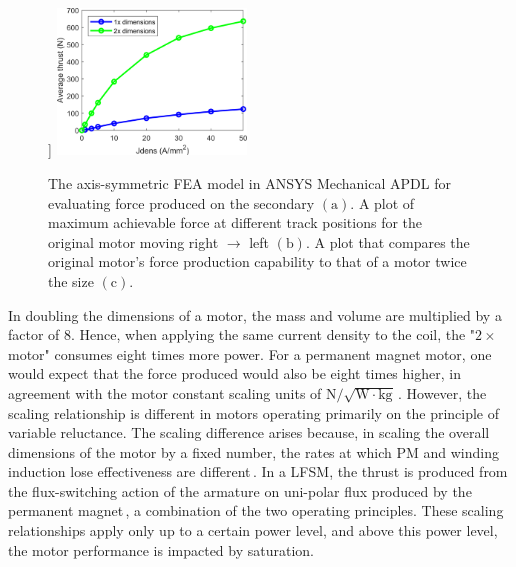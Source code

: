 \begin{figure}[!ht]
                    ]{
                    \includegraphics[width=0.45\textwidth]{chap4/images2/LFSM_scaling_effect.png}
                }
                \caption{ 
                    \label{fig:hap/rsm/LFSM/periodic_fea} The axis-symmetric \acs{FEA} model in ANSYS Mechanical APDL for evaluating force produced on the secondary $\mathrm{(a)}$. 
                    A plot of maximum achievable force at different track positions for
                    the original motor moving right $\rightarrow$ left $\mathrm{(b)}$.
                    A plot that compares the original motor's force production capability to that of a motor twice the size $\mathrm{(c)}$.
                }
            \end{figure}
    
        
            In doubling the dimensions of a motor, the mass and volume are multiplied by a factor of $8$. Hence, when applying the same current density to the coil, the "$2\times$ motor" consumes eight times more power. For a permanent magnet motor, one would expect that the force produced would also be eight times higher, in agreement with the motor constant scaling units of $\mathrm{N/\sqrt{W\cdot kg}}$\,\cite{Ruddy2011a}. However, the scaling relationship is different in motors operating primarily on the principle of variable reluctance. The scaling difference arises because, in scaling the overall dimensions of the motor by a fixed number, the rates at which PM and winding induction lose effectiveness are different\,\cite{Melcher1981}. In a \acs{LFSM}, the thrust is produced from the flux-switching action of the armature on uni-polar flux produced by the permanent magnet\,\cite{Cheng2011}, a combination of the two operating principles. These scaling relationships apply only up to a certain power level, and above this power level, the motor performance is impacted by saturation.  
    
